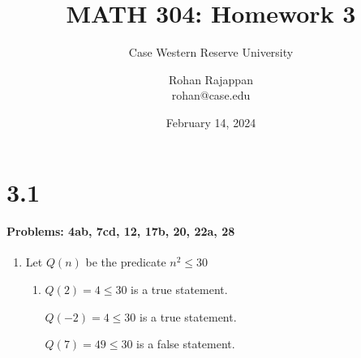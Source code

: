 \documentclass{article}
\title{MATH 304: Homework 3}
\subtitle{Case Western Reserve University}
\author{Rohan Rajappan \\rohan@case.edu}
\date{February 14, 2024}
\makeatletter
\newcommand\setItemnumber[1]{\setcounter{enum\romannumeral\@enumdepth}{\numexpr#1-1\relax}}
\makeatother
\begin{document}
\maketitle

\section{3.1}
 \paragraph{Problems: 4ab, 7cd, 12, 17b, 20, 22a, 28}
 \begin{enumerate}
     \setItemnumber{4}
     \item Let $Q(n)$ be the predicate $n^2 \leq 30$
     \begin{enumerate}
         \item $Q(2) = 4\leq 30$ is a true statement. 

         $Q(-2) = 4\leq 30$ is a true statement.

         $Q(7) = 49\leq 30$ is a false statement.


\end{enumerate}
\end{enumerate}
\end{document}
